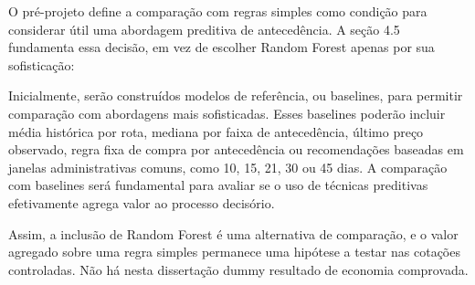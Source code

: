 O pré-projeto define a comparação com regras simples como condição para considerar útil uma abordagem preditiva de antecedência. A seção 4.5 fundamenta essa decisão, em vez de escolher Random Forest apenas por sua sofisticação:
\begin{citacao}
Inicialmente, serão construídos modelos de referência, ou baselines, para permitir comparação com abordagens mais sofisticadas. Esses baselines poderão incluir média histórica por rota, mediana por faixa de antecedência, último preço observado, regra fixa de compra por antecedência ou recomendações baseadas em janelas administrativas comuns, como 10, 15, 21, 30 ou 45 dias. A comparação com baselines será fundamental para avaliar se o uso de técnicas preditivas efetivamente agrega valor ao processo decisório. \parencite[seção 4.5]{goncalves2026}
\end{citacao}

Assim, a inclusão de Random Forest é uma alternativa de comparação, e o valor agregado sobre uma regra simples permanece uma hipótese a testar nas cotações controladas. Não há nesta dissertação dummy resultado de economia comprovada.
